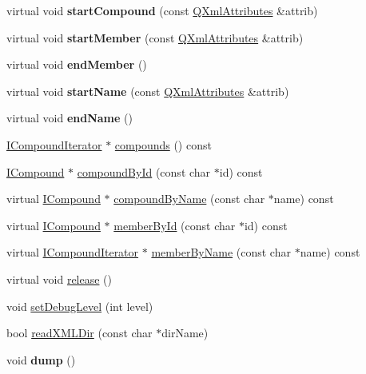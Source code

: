 \begin{DoxyCompactItemize}
\item 
\hypertarget{class_main_handler_acf79d78c3e6bdc9e5eaa8d28eb075633}{virtual void {\bfseries start\-Compound} (const \hyperlink{class_q_xml_attributes}{Q\-Xml\-Attributes} \&attrib)}\label{class_main_handler_acf79d78c3e6bdc9e5eaa8d28eb075633}

\item 
\hypertarget{class_main_handler_a01468590a99c462fcde01bef28afdadf}{virtual void {\bfseries start\-Member} (const \hyperlink{class_q_xml_attributes}{Q\-Xml\-Attributes} \&attrib)}\label{class_main_handler_a01468590a99c462fcde01bef28afdadf}

\item 
\hypertarget{class_main_handler_aad5c72a5dfbeff28021ccce9a5c307cd}{virtual void {\bfseries end\-Member} ()}\label{class_main_handler_aad5c72a5dfbeff28021ccce9a5c307cd}

\item 
\hypertarget{class_main_handler_a96036f328d26533f71146ef58e6de87f}{virtual void {\bfseries start\-Name} (const \hyperlink{class_q_xml_attributes}{Q\-Xml\-Attributes} \&attrib)}\label{class_main_handler_a96036f328d26533f71146ef58e6de87f}

\item 
\hypertarget{class_main_handler_a868f8da2b2359477e050549430602266}{virtual void {\bfseries end\-Name} ()}\label{class_main_handler_a868f8da2b2359477e050549430602266}

\item 
\hyperlink{class_i_compound_iterator}{I\-Compound\-Iterator} $\ast$ \hyperlink{class_main_handler_a094bceefa82be4001c5bdc060bee0171}{compounds} () const 
\item 
\hyperlink{class_i_compound}{I\-Compound} $\ast$ \hyperlink{class_main_handler_a8a551a5dbcc8fb5ce6408e5ef798130e}{compound\-By\-Id} (const char $\ast$id) const 
\item 
virtual \hyperlink{class_i_compound}{I\-Compound} $\ast$ \hyperlink{class_main_handler_abc1ec546239f33d12da9f41a7dc01e9c}{compound\-By\-Name} (const char $\ast$name) const 
\item 
virtual \hyperlink{class_i_compound}{I\-Compound} $\ast$ \hyperlink{class_main_handler_a5bc9b0aac0b44a78f926c8f80b470b1a}{member\-By\-Id} (const char $\ast$id) const 
\item 
virtual \hyperlink{class_i_compound_iterator}{I\-Compound\-Iterator} $\ast$ \hyperlink{class_main_handler_a6109b11df22ec70c933b33fde1138238}{member\-By\-Name} (const char $\ast$name) const 
\item 
virtual void \hyperlink{class_main_handler_a23b477d0e2d399f75d585d154c346591}{release} ()
\item 
void \hyperlink{class_main_handler_a00e20221233b98be6399e76e26131b5b}{set\-Debug\-Level} (int level)
\item 
bool \hyperlink{class_main_handler_af20949652fe80babe62bc80ebccaba77}{read\-X\-M\-L\-Dir} (const char $\ast$dir\-Name)
\item 
\hypertarget{class_main_handler_accd2600060dbaee3a3b41aed4034c63c}{void {\bfseries dump} ()}\label{class_main_handler_accd2600060dbaee3a3b41aed4034c63c}


\end{DoxyCompactItemize}
